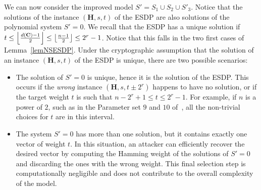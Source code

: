 \documentclass[11pt]{article}
\DeclarePairedDelimiter{\fl}{\lfloor}{\rfloor}
\theoremstyle{plain}
\theoremstyle{definition}
\theoremstyle{remark}
\begin{document}
We can now consider the improved model $S'=S_1\cup S_2\cup S'_3$. Notice that the solutions of the instance $(\mathbf{H},s,t)$ of the ESDP are also solutions of the polynomial system $S'=0$. We recall that the ESDP has a unique solution if $t\leq\fl*{\frac{d(\mathbf{C})-1}{2}}\leq\fl*{\frac{n-1}{2}}\leq 2^r-1$. Notice that this falls in the two first cases of Lemma~\ref{lemNSESDP}.
Under the cryptographic assumption that the solution of an instance $(\mathbf{H},s,t)$ of the ESDP is unique, there are two possible scenarios:
\begin{itemize}
    \item The solution of $S'=0$ is unique, hence it is the solution of the ESDP. This occurs if the \textit{wrong} instance $(\mathbf{H},s,t\pm 2^r)$ happens to have no solution, or if the target weight $t$ is such that $n-2^r+1\leq t\leq 2^r-1$. For example, if $n$ is a power of $2$, such as in the Parameter set $9$ and $10$ of~\cite{ClassicMcEliece2022}, all the non-trivial choices for $t$ are in this interval.
    \item The system $S'=0$ has more than one solution, but it contains exactly one vector of weight $t$. In this situation, an attacker can efficiently recover the desired vector by computing the Hamming weight of the solutions of $S'=0$ and discarding the ones with the wrong weight. This final selection step is computationally negligible and does not contribute to the overall complexity of the model.
\end{itemize}
\end{document}

